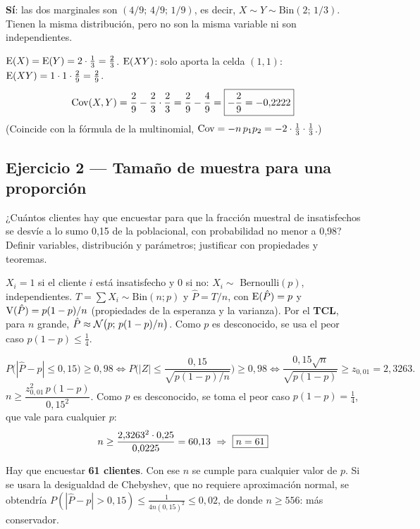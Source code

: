 \textbf{Sí}: las dos marginales son $(4/9;\,4/9;\,1/9)$, es decir, $X\sim Y\sim\mathrm{Bin}(2;\,1/3)$. Tienen la misma distribución, pero no son la misma variable ni son independientes.

$\mathrm{E}(X)=\mathrm{E}(Y)=2\cdot\frac13=\frac23$. \quad $\mathrm{E}(XY)$: solo aporta la celda $(1,1)$: $\mathrm{E}(XY)=1\cdot1\cdot\frac29=\frac29$.
\[
\mathrm{Cov}(X,Y)=\frac29-\frac23\cdot\frac23=\frac29-\frac49=\boxed{-\frac29=-0{,}2222}
\]
(Coincide con la fórmula de la multinomial, $\mathrm{Cov}=-n\,p_1p_2=-2\cdot\frac13\cdot\frac13$.)

\subsection{Ejercicio 2 --- Tamaño de muestra para una proporción}
\begin{enun}
¿Cuántos clientes hay que encuestar para que la fracción muestral de insatisfechos se desvíe a lo sumo 0,15 de la poblacional, con probabilidad no menor a 0,98? Definir variables, distribución y parámetros; justificar con propiedades y teoremas.
\end{enun}
\begin{metodo}
$X_i=1$ si el cliente $i$ está insatisfecho y 0 si no: $X_i\sim$ Bernoulli$(p)$, independientes.
$T=\sum X_i\sim\mathrm{Bin}(n;p)$ y $\hat P=T/n$, con $\mathrm{E}(\hat P)=p$ y $\mathrm{V}(\hat P)=p(1-p)/n$ (propiedades de la esperanza y la varianza).
Por el \textbf{TCL}, para $n$ grande, $\hat P\approx\mathcal{N}\big(p;\,p(1-p)/n\big)$. Como $p$ es desconocido, se usa el peor caso $p(1-p)\le\frac14$.
\end{metodo}
\[
P\big(|\hat P-p|\le0{,}15\big)\ge0{,}98\iff P\Big(|Z|\le\frac{0{,}15}{\sqrt{p(1-p)/n}}\Big)\ge0{,}98\iff\frac{0{,}15\sqrt n}{\sqrt{p(1-p)}}\ge z_{0,01}=2{,}3263.
\]
 $n\ge\dfrac{z_{0,01}^2\,p(1-p)}{0{,}15^2}$. Como $p$ es desconocido, se toma el peor caso $p(1-p)=\frac14$, que vale para cualquier $p$:
\[
n\ge\frac{2{,}3263^2\cdot0{,}25}{0{,}0225}=60{,}13\ \Rightarrow\ \res{n=61}
\]
\begin{resp}
Hay que encuestar \textbf{61 clientes}. Con ese $n$ se cumple para cualquier valor de $p$.
Si se usara la desigualdad de Chebyshev, que no requiere aproximación normal, se obtendría $P(|\hat P-p|>0{,}15)\le\frac{1}{4n(0{,}15)^2}\le0{,}02$, de donde $n\ge556$: más conservador.
\end{resp}

